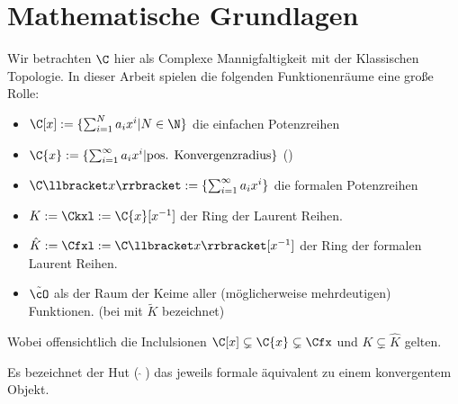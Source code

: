 \chapter{Mathematische Grundlagen}

\begin{comment}
Hier werde ich mich auf \cite{sabbah_cimpa90} und \cite{coutinho1995primer}
beziehen.
\end{comment}

Wir betrachten $\C$ hier als Complexe Mannigfaltigkeit mit der Klassischen
Topologie.
In dieser Arbeit spielen die folgenden Funktionenräume eine große Rolle:
\begin{itemize}
\item $\C[x]:=\{ \sum^{N}_{i=1}a_ix^i | N\in \N \}$ die einfachen Potenzreihen
\item $\C\{x\}:=\{ \sum^{\infty}_{i=1}a_ix^i | \mbox{pos.
Konvergenzradius}\}$ (\cite[Chap 5.1.1]{hotta2007d})
\item $\C\llbracket x\rrbracket:=\{ \sum^{\infty}_{i=1}a_ix^i \}$ die formalen
Potenzreihen
\item $K:=\Ckxl:=\C\{x\}[x^{-1}]$ der Ring der Laurent Reihen.
\item $\hat{K}:=\Cfxl:=\C\llbracket x\rrbracket[x^{-1}]$ der Ring der
formalen Laurent Reihen.
\item $\tilde\cO$ als der Raum der Keime aller (möglicherweise mehrdeutigen)
Funktionen. (bei \cite{hotta2007d} mit $\tilde K$ bezeichnet)
\end{itemize}
Wobei offensichtlich die Inclulsionen $\C[x]\subsetneq\C\{x\}\subsetneq\Cfx$
und $K\subsetneq\hat K$ gelten.

Es bezeichnet der Hut ($ \, \hat \,\, $) das jeweils formale äquivalent zu
einem konvergentem Objekt.

\iffalse
  \begin{comment}
  \begin{lem}[Seite 2]
  ein paar eigenschaften
  \begin{enumerate}
  \item $\C[x]$ ist ein graduierter Ring, durch die Grad der
  Polynome. Diese graduierung induziert eine aufsteigende Filtrierung.

  alle Ideale haben die form $(x-a)$ mit $a\in \C$
  \item wenn $\mathfrak{m}$ das maximale Ideal von $\C[x]$ (erzeugt von
  $x$ ist), so ist
  \[
    \C[[x]]=
    \underset{k}{\underleftarrow{\lim}} \C[X]\backslash\mathfrak{m}^k
  \]
  The ring $\C[[x]]$ ist ein nöterscher lokaler Ring:
  jede Potenzreihe mit konstantem term $\neq 0$ ist invertierbar.

  Der ring ist ebenfalls ein diskreter ??? Ring (discrete valuation
  ring)

  Die Filtrierung nach grad des Maximalen Ideals, genannt
  $\mathfrak{m}$-adische Fitration, ist die Filtrierung
  $\mathfrak{m}^k=\{f\in \C[[x]]|v(f)\geq k\}$

  und es gilt $gr_\mathfrak{m}(\C[[x]])=\C[x]$
  \end{enumerate}
  \end{lem}
  \end{comment}
\fi

